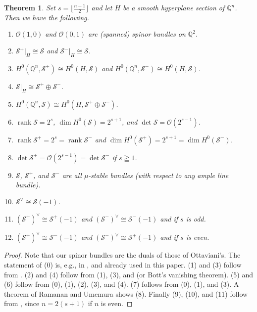 \documentclass[a4paper,12pt]{amsart}
\newtheorem{thm}{Theorem}[section]
\DeclareMathOperator{\rk}{rank}
\begin{document}
\begin{thm}\label{Usefulottaviani}
Set $s=\lfloor \frac{n-1}{2}\rfloor$
and let $H$ be a smooth hyperplane section of $\mathbb{Q}^n$.
Then we have the following.
\begin{enumerate}
\item[(0)] $\mathcal{O}(1,0)$ and $\mathcal{O}(0,1)$
are (spanned) spinor bundles on $\mathbb{Q}^2$.
\item $\mathcal{S}^+|_{H}\cong \mathcal{S}$ and $\mathcal{S}^-|_{H}\cong \mathcal{S}$.
\item $H^0(\mathbb{Q}^n, \mathcal{S}^+)\cong H^0(H,\mathcal{S})$
and $H^0(\mathbb{Q}^n, \mathcal{S}^-)\cong H^0(H,\mathcal{S})$.
\item $\mathcal{S}|_{H}\cong \mathcal{S}^+\oplus\mathcal{S}^-$.
\item $H^0(\mathbb{Q}^n, \mathcal{S})\cong H^0(H,\mathcal{S}^+\oplus\mathcal{S}^-)$.
\item $\rk \mathcal{S}=2^s$, $\dim H^0(\mathcal{S})=2^{s+1}$, and $\det\mathcal{S}=\mathcal{O}(2^{s-1})$.
\item 
$\rk \mathcal{S}^{+}=2^s=\rk \mathcal{S}^{-}$ and $\dim H^0(\mathcal{S}^{+})=2^{s+1}=\dim H^0(\mathcal{S}^{-})$.
\item $\det\mathcal{S}^{+}=\mathcal{O}(2^{s-1})=\det\mathcal{S}^{-}$ if $s\geqq 1$.
\item $\mathcal{S}$, $\mathcal{S}^+$, and  $\mathcal{S}^-$ are all $\mu$-stable bundles (with respect to 
any ample line bundle).
\item $\mathcal{S}^{\vee}\cong \mathcal{S}(-1)$.
\item $(\mathcal{S}^+)^{\vee}\cong \mathcal{S}^+(-1)$ 
and $(\mathcal{S}^-)^{\vee}\cong \mathcal{S}^-(-1)$ 
and if $s$ is 
odd.
\item $(\mathcal{S}^+)^{\vee}\cong \mathcal{S}^-(-1)$ 
and $(\mathcal{S}^-)^{\vee}\cong \mathcal{S}^+(-1)$ 
and if $s$ is 
even.
\end{enumerate}
\end{thm}
\begin{proof}
Note that our spinor bundles are the duals of those of Ottaviani's.
The statement of (0) is,
e.g., in \cite[Example 1.5]{ot},
and already used in this paper.
(1) and (3) follow from \cite[Theorem 1.4]{ot}.
(2) and (4) follow from (1), (3), and \cite[Theorem 2.3]{ot} (or Bott's vanishing theorem).
(5) and (6) follow from (0), (1), (2), (3), and (4).
(7) follows from (0), (1), and (3).
A theorem of Ramanan 
\cite{MR0190947} 
and Umemura \cite[Theorem (2.4)]{MR0473243}
shows (8).
Finally (9), (10), and (11) follow from \cite[Theorem 2.8]{ot},
since $n=2(s+1)$ if $n$ is even.
\end{proof}
\end{document}
